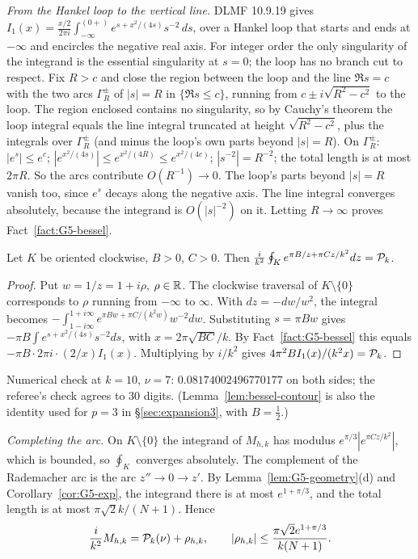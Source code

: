 \emph{From the Hankel loop to the vertical line.} DLMF 10.9.19 \cite{DLMF} gives
$I_1(x)=\frac{x/2}{2\pi i}\int_{-\infty}^{(0+)}e^{s+x^2/(4s)}s^{-2}\,ds$, over a Hankel loop that starts and ends at
$-\infty$ and encircles the negative real axis. For integer order the only singularity of the integrand is the essential
singularity at $s=0$; the loop has no branch cut to respect. Fix $R>c$ and close the region between the loop and the line
$\Re s=c$ with the two arcs $\Gamma_R^\pm$ of $|s|=R$ in $\{\Re s\le c\}$, running from $c\pm i\sqrt{R^2-c^2}$ to the loop.
The region enclosed contains no singularity, so by Cauchy's theorem the loop integral equals the line integral truncated at
height $\sqrt{R^2-c^2}$, plus the integrals over $\Gamma_R^\pm$ (and minus the loop's own parts beyond $|s|=R$). On
$\Gamma_R^\pm$: $|e^s|\le e^c$; $|e^{x^2/(4s)}|\le e^{x^2/(4R)}\le e^{x^2/(4c)}$; $|s^{-2}|=R^{-2}$; the total length is at
most $2\pi R$. So the arcs contribute $O(R^{-1})\to0$. The loop's parts beyond $|s|=R$ vanish too, since $e^s$ decays
along the negative axis. The line integral converges absolutely, because the integrand is $O(|s|^{-2})$ on it. Letting
$R\to\infty$ proves Fact~\ref{fact:G5-bessel}.

\begin{lemma}\label{lem:bessel-contour}
Let $K$ be oriented clockwise, $B>0$, $C>0$. Then $\frac i{k^2}\oint_Ke^{\pi B/z+\pi Cz/k^2}dz=\mathcal P_k$.
\end{lemma}
\begin{proof}
Put $w=1/z=1+i\rho$, $\rho\in\mathbb R$. The clockwise traversal of $K\setminus\{0\}$ corresponds to $\rho$ running from $-\infty$
to $\infty$. With $dz=-dw/w^2$, the integral becomes $-\int_{1-i\infty}^{1+i\infty}e^{\pi Bw+\pi C/(k^2w)}w^{-2}dw$.
Substituting $s=\pi Bw$ gives $-\pi B\int e^{s+x^2/(4s)}s^{-2}ds$, with $x=2\pi\sqrt{BC}/k$. By
Fact~\ref{fact:G5-bessel} this equals $-\pi B\cdot 2\pi i\cdot(2/x)I_1(x)$. Multiplying by $i/k^2$ gives
$4\pi^2BI_1(x)/(k^2x)=\mathcal P_k$.
\end{proof}
Numerical check at $k=10$, $\nu=7$: $0.08174002496770177$ on both sides; the referee's check agrees to $30$ digits.
(Lemma~\ref{lem:bessel-contour} is also the identity used for $p=3$ in \S\ref{sec:expansion3}, with $B=\frac12$.)

\emph{Completing the arc.} On $K\setminus\{0\}$ the integrand of $M_{h,k}$ has modulus $e^{\pi/3}|e^{\pi Cz/k^2}|$, which
is bounded, so $\oint_K$ converges absolutely. The complement of the Rademacher arc is the arc $z''\to0\to z'$. By
Lemma~\ref{lem:G5-geometry}(d) and Corollary~\ref{cor:G5-exp}, the integrand there is at most $e^{1+\pi/3}$, and the total
length is at most $\pi\sqrt2k/(N+1)$. Hence
\begin{equation}\label{eq:G5-main}
\frac i{k^2}M_{h,k}=\mathcal P_k(\nu)+\rho_{h,k},\qquad|\rho_{h,k}|\le\frac{\pi\sqrt2e^{1+\pi/3}}{k(N+1)}.
\end{equation}

